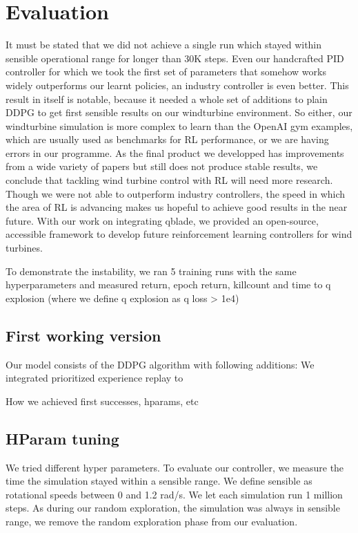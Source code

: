 \documentclass[hyperref,german,beleg]{cgvpub}
\begin{document}
\chapter{Evaluation}

It must be stated that we did not achieve a single run which stayed within sensible operational range for longer than 30K steps. Even our handcrafted PID controller for which we took the first set of parameters that somehow works widely outperforms our learnt policies, an industry controller is even better. This result in itself is notable, because it needed a whole set of additions to plain \ac{DDPG} to get first sensible results on our windturbine environment. So either, our windturbine simulation is more complex to learn than the OpenAI gym examples, which are usually used as benchmarks for \ac{RL} performance, or we are having errors in our programme. As the final product we developped has improvements from a wide variety of papers but still does not produce stable results, we conclude that tackling wind turbine control with \ac{RL} will need more research. Though we were not able to outperform industry controllers, the speed in which the area of \ac{RL} is advancing makes us hopeful to achieve good results in the near future. With our work on integrating qblade, we provided an open-source, accessible framework to develop future reinforcement learning controllers for wind turbines.

To demonstrate the instability, we ran 5 training runs with the same hyperparameters and measured return, epoch return, killcount and time to q explosion (where we define q explosion as q loss > 1e4)

\section{First working version}

Our model consists of the DDPG algorithm with following additions:
We integrated prioritized experience replay to

How we achieved first successes, hparams, etc

\section{HParam tuning}
We tried different hyper parameters. To evaluate our controller, we measure the time the simulation stayed within a sensible range. We define sensible as rotational speeds between 0 and 1.2 rad/s. We let each simulation run 1 million steps. As during our random exploration, the simulation was always in sensible range, we remove the random exploration phase from our evaluation.
\end{document}
